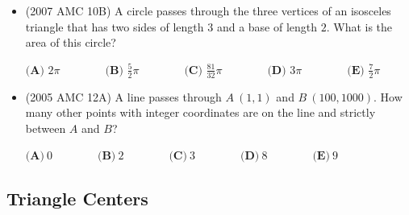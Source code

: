 \documentclass{article}
\begin{document}
\begin{itemize}
\item (2007 AMC 10B) A circle passes through the three vertices of an isosceles triangle that has two sides of length $3$ and a base of length $2$. What is the area of this circle?

\begin{center}
$\textbf{(A) } 2\pi \qquad\qquad\textbf{(B) } \frac{5}{2}\pi \qquad\qquad\textbf{(C) } \frac{81}{32}\pi \qquad\qquad\textbf{(D) } 3\pi \qquad\qquad\textbf{(E) } \frac{7}{2}\pi$
\end{center}

\item (2005 AMC 12A) A line passes through $A\ (1,1)$ and $B\ (100,1000)$. How many other points with integer coordinates are on the line and strictly between $A$ and $B$?

\begin{center}
$
\textbf {(A)} \ 0 \qquad\qquad \textbf {(B)} \ 2 \qquad\qquad \textbf {(C)}\ 3 \qquad\qquad \textbf {(D)} \ 8 \qquad\qquad \textbf {(E)}\ 9
$
\end{center}


\end{itemize}

\subsection{Triangle Centers}
\end{document}
